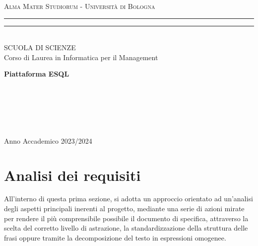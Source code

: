 \documentclass{article}
\begin{document}
\pagestyle{empty}

\begin{titlepage}
\begin{center}
    {{\Large{\textsc{Alma Mater Studiorum - Università di Bologna}}}}
    \rule[0.1cm]{\textwidth}{0.1px}
    \rule[0.5cm]{\textwidth}{0.6px}\\
    {\large{SCUOLA DI SCIENZE \\ Corso di Laurea in Informatica per il Management}}
\end{center}

\vspace{50px}

\begin{center}
    {\LARGE{{\bf Piattaforma ESQL}}}\\
\end{center}

\vspace{115px}
\par
\noindent
\begin{minipage}[t]{0.04\textwidth}
~
\end{minipage}
\begin{minipage}[t]{0.4\textwidth}
\end{minipage}
\hfill
\begin{minipage}[t]{0.4\textwidth}\raggedleft
    {\\
}
\end{minipage}
\begin{minipage}[t]{0.04\textwidth}
~
\end{minipage}

\vspace*{210px}

\begin{center}
    \large{Anno Accademico 2023/2024}
\end{center}
\end{titlepage}

\section{Analisi dei requisiti}
\setcounter{subsection}{1}
\large
All'interno di questa prima sezione, si adotta un approccio orientato ad un'analisi degli aspetti principali inerenti al progetto, mediante una serie di azioni mirate per rendere il più comprensibile possibile il documento di specifica, attraverso la scelta del corretto livello di astrazione, la standardizzazione della struttura delle frasi oppure tramite la decomposizione del testo in espressioni omogenee.
\end{document}
